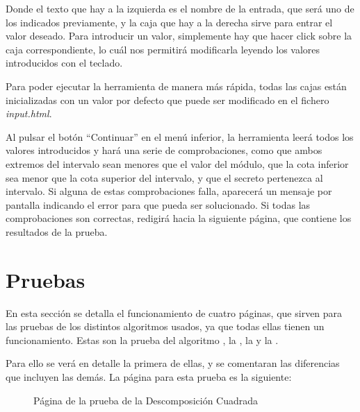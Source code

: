 Donde el texto que hay a la izquierda es el nombre de la entrada, que será uno de los indicados previamente, y la caja que hay a la derecha sirve para entrar el valor deseado. Para introducir un valor, simplemente hay que hacer click sobre la caja correspondiente, lo cuál nos permitirá modificarla leyendo los valores introducidos con el teclado.

Para poder ejecutar la herramienta de manera más rápida, todas las cajas están inicializadas con un valor por defecto que puede ser modificado en el fichero \emph{input.html}.

Al pulsar el botón ``Continuar'' en el menú inferior, la herramienta leerá todos los valores introducidos y hará una serie de comprobaciones, como que ambos extremos del intervalo sean menores que el valor del módulo, que la cota inferior sea menor que la cota superior del intervalo, y que el secreto pertenezca al intervalo. Si alguna de estas comprobaciones falla, aparecerá un mensaje por pantalla indicando el error para que pueda ser solucionado. Si todas las comprobaciones son correctas, redigirá hacia la siguiente página, que contiene los resultados de la prueba.

\section*{Pruebas}

En esta sección se detalla el funcionamiento de cuatro páginas, que sirven para las pruebas de los distintos algoritmos usados, ya que todas ellas tienen un funcionamiento. Estas son la prueba del algoritmo , la , la  y la .

Para ello se verá en detalle la primera de ellas, y se comentaran las diferencias que incluyen las demás. La página para esta prueba es la siguiente:
\begin{figure}[H]
    \centering
    \caption{Página de la prueba de la Descomposición Cuadrada}
    \label{im:proveSD2}
\end{figure}

